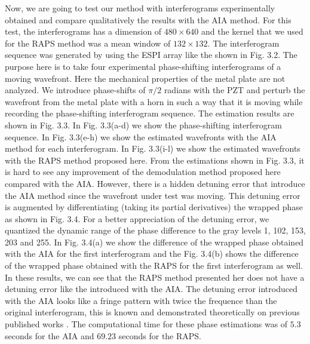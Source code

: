 Now, we are going to test our method with interferograms experimentally obtained
and compare qualitatively the results with the AIA method. For this test, the
interferograms has a dimension of $480 \times 640$ and the kernel that we used
for the RAPS method was a mean window of $132\times 132$. The interferogram
sequence was generated by using the ESPI array like the shown in Fig. 3.2. The
purpose here is to take four experimental phase-shifting interferograms of a
moving wavefront. Here the mechanical properties of the metal plate are not
analyzed. We introduce phase-shifts of $\pi/2$ radians with the PZT and perturb
the wavefront from the metal plate with a horn in such a way that it is moving
while recording the phase-shifting interferogram sequence. The estimation
results are shown in Fig. 3.3. In Fig. 3.3(a-d) we show the phase-shifting
interferogram sequence. In Fig. 3.3(e-h) we show the estimated wavefronts with
the AIA method for each interferogram. In Fig. 3.3(i-l) we show the estimated
wavefronts with the RAPS method proposed here. From the estimations shown in
Fig. 3.3, it is hard to see any improvement of the demodulation method proposed
here compared with the AIA. However, there is a hidden detuning error that
introduce the AIA method since the wavefront under test was moving. This
detuning error is augmented by differentiating (taking its partial derivatives)
the wrapped phase as shown in Fig. 3.4. For a better appreciation of the
detuning error, we quantized the dynamic range of the phase difference to the
gray levels 1, 102, 153, 203 and 255. In Fig. 3.4(a) we show the difference of
the wrapped phase obtained with the AIA for the first interferogram and the
Fig. 3.4(b) shows the difference of the wrapped phase obtained with the RAPS for
the first interferogram as well. In these results, we can see that the RAPS
method presented her does not have a detuning error like the introduced with the
AIA. The detuning error introduced with the AIA looks like a fringe pattern with
twice the frequence than the original interferogram, this is known and
demonstrated theoretically on previous published works
\cite{Schwider:83,Servin:09}. The computational time for these phase
estimations was of $5.3$ seconds for the AIA and $69.23$ seconds for the RAPS.

